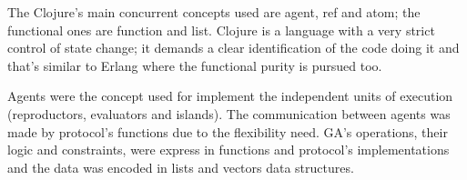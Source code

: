 The Clojure’s main concurrent concepts used are agent, ref and atom; the functional ones are function and list. Clojure is a language with a very strict control of state change; it demands a clear identification of the code doing it and that’s similar to Erlang where the functional purity is pursued too.

Agents were the concept used for implement the independent units of execution (reproductors, evaluators and islands). The communication between agents was made by protocol’s functions due to the flexibility need. GA’s operations, their logic and constraints, were express in functions and protocol’s implementations and the data was encoded in lists and vectors data structures. 